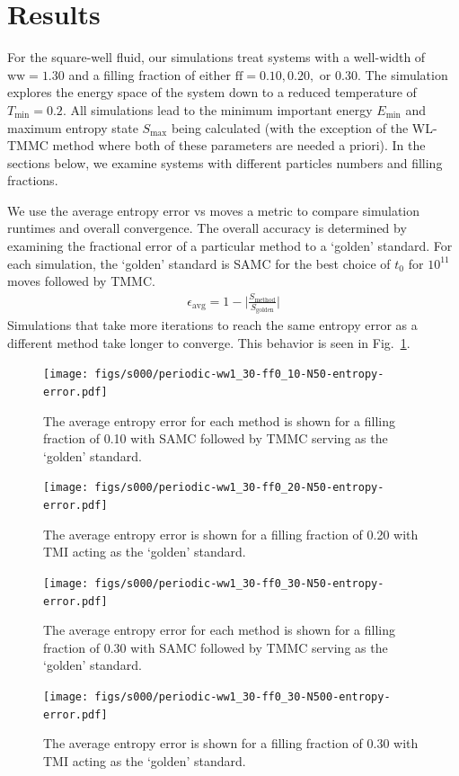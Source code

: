 \documentclass[letterpaper,twocolumn,amsmath,amssymb,pre,aps,10pt]{revtex4-1}
\begin{document}
\section{Results}

For the square-well fluid, our simulations treat systems with a
well-width of $\text{ww} = 1.30$ and a filling fraction of either
$\text{ff} = 0.10, 0.20,$ or $0.30$.  The simulation explores the
energy space of the system down to a reduced temperature of
$T_{\text{min}} = 0.2$.  All simulations lead to the minimum important
energy $E_{\text{min}}$ and maximum entropy state $S_{\text{max}}$
being calculated (with the exception of the WL-TMMC method where both
of these parameters are needed a priori).  In the sections below, we
examine systems with different particles numbers and filling fractions.

We use the average entropy error vs moves a metric to compare
simulation runtimes and overall convergence. The overall accuracy
is determined by examining the fractional error of a particular method to
a `golden' standard. For each simulation, the `golden' standard is
SAMC for the best choice of $t_0$ for $10^{11}$ moves followed by TMMC.
\begin{align}
\epsilon_\text{avg} = 1 - \bigg\lvert\frac{S_\text{method}}{S_\text{golden}}\bigg\rvert
\end{align}
Simulations that take more iterations to reach the same entropy error as a
different method take longer to converge. This behavior is seen in
Fig.~\ref{fig:N50-ff0.1-avg-error}.

\begin{figure}
  \texttt{[image: figs/s000/periodic-ww1\_30-ff0\_10-N50-entropy-error.pdf]}
  \caption{The average entropy error for each method is shown for a filling fraction of 0.10 with
  SAMC followed by TMMC serving as the `golden' standard.}\label{fig:N50-ff0.1-avg-error}
\end{figure}
\begin{figure}
  \texttt{[image: figs/s000/periodic-ww1\_30-ff0\_20-N50-entropy-error.pdf]}
  \caption{The average entropy error is shown for a filling fraction of 0.20 with TMI acting as the
  `golden' standard.}\label{fig:N50-ff0.2-avg-error}
\end{figure}
\begin{figure}
  \texttt{[image: figs/s000/periodic-ww1\_30-ff0\_30-N50-entropy-error.pdf]}
  \caption{The average entropy error for each method is shown for a filling fraction of 0.30 with
  SAMC followed by TMMC serving as the `golden'
  standard.}\label{fig:N50-ff0.3-avg-error}
\end{figure}
\begin{figure}
\texttt{[image: figs/s000/periodic-ww1\_30-ff0\_30-N500-entropy-error.pdf]}
  \caption{The average entropy error is shown for a filling fraction of 0.30 with TMI acting as the
  `golden' standard.}\label{fig:n500-ff0.2}
\end{figure}
\end{document}
